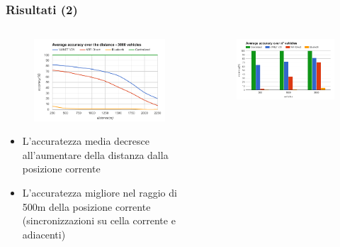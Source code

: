 \documentclass{beamer}
\begin{document}
\begin{frame}[shrink=50]
\frametitle{Risultati (2)}
\begin{columns}
  \begin{column}{0.45\textwidth}
    \vspace{30mm}
    \begin{figure}
    \includegraphics[width=\columnwidth]{img/graphics/distance.png}
    \end{figure}
    \begin{itemize}
      \item  L'accuratezza media decresce all'aumentare della distanza dalla posizione corrente
      \item  L'accuratezza migliore nel raggio di 500m della posizione corrente (sincronizzazioni su cella corrente e adiacenti)
    \end{itemize}
  \end{column}
  \begin{column}{0.45\textwidth}
    \vspace{20mm}
    \begin{figure}
    \includegraphics[width=\columnwidth]{img/graphics/n_car.png}

\end{figure}
\end{column}
\end{columns}
\end{frame}
\end{document}
